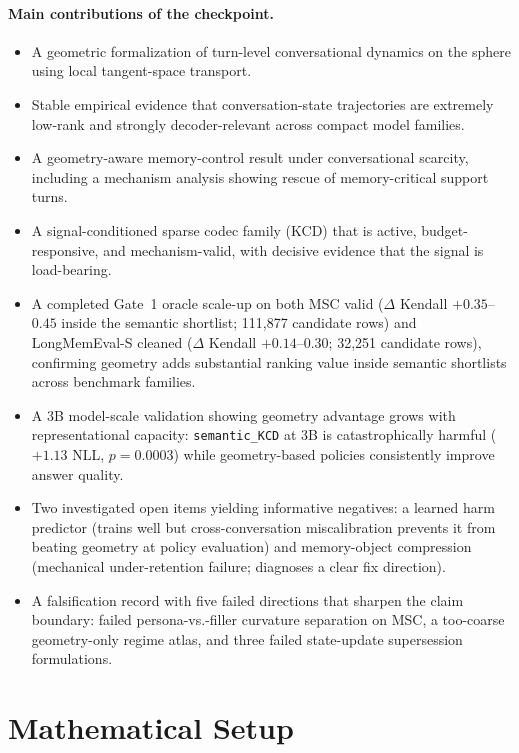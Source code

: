 \documentclass[conference]{IEEEtran}
\begin{document}
\paragraph{Main contributions of the checkpoint.}
\begin{itemize}[leftmargin=1.4em]
    \item A geometric formalization of turn-level conversational dynamics on the sphere using local tangent-space transport.
    \item Stable empirical evidence that conversation-state trajectories are extremely low-rank and strongly decoder-relevant across compact model families.
    \item A geometry-aware memory-control result under conversational scarcity, including a mechanism analysis showing rescue of memory-critical support turns.
    \item A signal-conditioned sparse codec family (KCD) that is active, budget-responsive, and mechanism-valid, with decisive evidence that the signal is load-bearing.
    \item A completed Gate~1 oracle scale-up on both MSC valid ($\Delta$ Kendall $+0.35$--$0.45$ inside the semantic shortlist; 111{,}877 candidate rows) and LongMemEval-S cleaned ($\Delta$ Kendall $+0.14$--$0.30$; 32{,}251 candidate rows), confirming geometry adds substantial ranking value inside semantic shortlists across benchmark families.
    \item A 3B model-scale validation showing geometry advantage grows with representational capacity: \texttt{semantic\_KCD} at 3B is catastrophically harmful ($+1.13$ NLL, $p=0.0003$) while geometry-based policies consistently improve answer quality.
    \item Two investigated open items yielding informative negatives: a learned harm predictor (trains well but cross-conversation miscalibration prevents it from beating geometry at policy evaluation) and memory-object compression (mechanical under-retention failure; diagnoses a clear fix direction).
    \item A falsification record with five failed directions that sharpen the claim boundary: failed persona-vs.-filler curvature separation on MSC, a too-coarse geometry-only regime atlas, and three failed state-update supersession formulations.
\end{itemize}

\section{Mathematical Setup}
\end{document}
